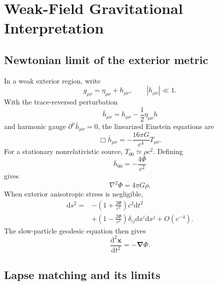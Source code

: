 \documentclass[journal,a4paper]{IEEEtran}
\begin{document}
\section{Weak-Field Gravitational Interpretation}
\label{sec:weak_gravity}

\subsection{Newtonian limit of the exterior metric}

In a weak exterior region, write
\begin{equation}
    g_{\mu\nu}=\eta_{\mu\nu}+h_{\mu\nu},
    \qquad |h_{\mu\nu}|\ll1.
\end{equation}
With the trace-reversed perturbation
\begin{equation}
    \bar h_{\mu\nu}
    =h_{\mu\nu}-\frac{1}{2}\eta_{\mu\nu}h
\end{equation}
and harmonic gauge \(\partial^\mu\bar h_{\mu\nu}=0\), the linearized Einstein equations are
\begin{equation}
    \Box\bar h_{\mu\nu}
    =-\frac{16\pi G}{c^4}T_{\mu\nu}.
    \label{eq:linearized_einstein}
\end{equation}
For a stationary nonrelativistic source, \(T_{00}\simeq\rho c^2\). Defining
\begin{equation}
    \bar h_{00}=-\frac{4\Phi}{c^2}
\end{equation}
gives
\begin{equation}
    \boxed{\nabla^2\Phi=4\pi G\rho.}
    \label{eq:poisson_from_gr}
\end{equation}
When exterior anisotropic stress is negligible,
\begin{equation}
\begin{split}
    \mathrm{d}s^2={}&
    -\left(1+\frac{2\Phi}{c^2}\right)c^2\mathrm{d}t^2\\
    &+\left(1-\frac{2\Phi}{c^2}\right)
    \delta_{ij}\mathrm{d}x^i\mathrm{d}x^j
    +O(c^{-4}).
    \label{eq:weak_metric}
\end{split}
\end{equation}
The slow-particle geodesic equation then gives
\begin{equation}
    \frac{\mathrm{d}^2\mathbf x}{\mathrm{d}t^2}
    =-\boldsymbol\nabla\Phi.
\end{equation}

\subsection{Lapse matching and its limits}
\end{document}
